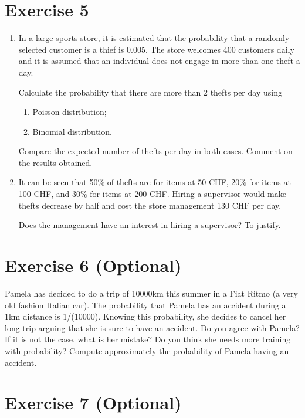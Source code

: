 \documentclass[12pt,thmsa]{article}\usepackage[]{graphicx}\usepackage[]{color}
\begin{document}
\section*{Exercise 5}

\begin{enumerate}%

\item In a large sports store, it is estimated that the probability that a randomly selected customer is a thief is 0.005. The store welcomes 400 customers daily and it is assumed that an individual does not engage in more than one theft a day.

\noindent Calculate the probability that there are more than 2 thefts per day using
\begin{enumerate}
\item Poisson distribution;
\item Binomial distribution.
\end{enumerate}

\noindent Compare the expected number of thefts per day in both cases. Comment on the results obtained.

\item It can be seen that 50\% of thefts are for items at 50 CHF, 20\% for items at 100 CHF, and 30\% for items at 200 CHF. Hiring a supervisor would make thefts decrease by half and cost the store management 130 CHF per day.

\noindent Does the management have an interest in hiring a supervisor? To justify.

\end{enumerate}

\newpage

\section*{Exercise 6 (Optional)}

Pamela has decided to do a trip of 10000km this summer in a Fiat Ritmo (a very old fashion Italian car). The probability that Pamela has an accident during a 1km distance is 1/(10000).
Knowing this probability, she decides to cancel her long trip arguing that she is sure to have an accident. Do you agree with Pamela? If it is not the case, what is her mistake? Do you think she needs more training with probability? Compute approximately the probability of Pamela having an accident.


\section*{Exercise 7 (Optional)}
\end{document}
